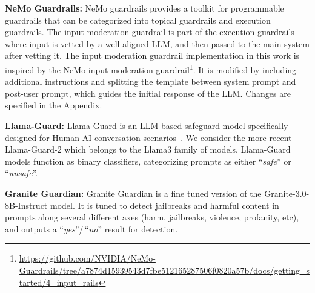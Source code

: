 \noindent\textbf{NeMo Guardrails:} NeMo guardrails \cite{rebedea2023nemo} provides a toolkit for programmable guardrails that can be categorized into topical guardrails and execution guardrails. The input moderation guardrail is part of the execution guardrails where input is vetted by a well-aligned LLM, and then passed to the main system after vetting it. 
The input moderation guardrail implementation in this work is inspired by the NeMo input moderation guardrail\footnote{\url{ https://github.com/NVIDIA/NeMo-Guardrails/tree/a7874d15939543d7fbe512165287506f0820a57b/docs/getting_started/4_input_rails}}. It is modified by including additional instructions and splitting the template between system prompt and post-user prompt, which guides the initial response of the LLM. Changes are specified in the Appendix. 

\noindent\textbf{Llama-Guard:} Llama-Guard is an LLM-based safeguard model specifically designed for Human-AI conversation scenarios~\cite{DBLP:journals/corr/abs-2312-06674}. We consider the more recent Llama-Guard-2 \cite{llamaguard2} which belongs to the Llama3 family of models.
Llama-Guard models function as binary classifiers, categorizing prompts as either ``\textit{safe}'' or ``\textit{unsafe}''.

\noindent\textbf{Granite Guardian:} Granite Guardian is a fine tuned version of the Granite-3.0-8B-Instruct model. It is tuned to detect jailbreaks and harmful content in prompts along several different axes (harm, jailbreaks, violence, profanity, etc), and outputs a ``\emph{yes}''/\,``\emph{no}'' result for detection.  